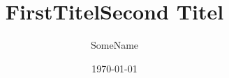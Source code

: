 \documentclass[aspectratio=169]{beamer}
\title{FirstTitel}
\author{SomeName}
\date{\today}
\begin{document}
\begin{frame}[plain]
    \titlepage
\end{frame}

\title{Second Titel}
\begin{frame}[plain]
    \titlepage
\end{frame}
\end{document}
